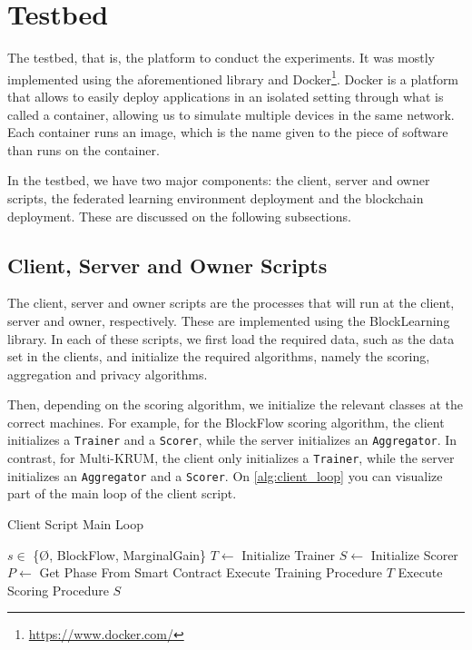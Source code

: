 \section{Testbed}

The testbed, that is, the platform to conduct the experiments. It was mostly implemented using the aforementioned library and Docker\footnote{\url{https://www.docker.com/}}. Docker is a platform that allows to easily deploy applications in an isolated setting through what is called a container, allowing us to simulate multiple devices in the same network. Each container runs an image, which is the name given to the piece of software than runs on the container.

In the testbed, we have two major components: the client, server and owner scripts, the federated learning environment deployment and the blockchain deployment. These are discussed on the following subsections.

\subsection{Client, Server and Owner Scripts}

The client, server and owner scripts are the processes that will run at the client, server and owner, respectively. These are implemented using the BlockLearning library. In each of these scripts, we first load the required data, such as the data set in the clients, and initialize the required algorithms, namely the scoring, aggregation and privacy algorithms.

Then, depending on the scoring algorithm, we initialize the relevant classes at the correct machines. For example, for the BlockFlow scoring algorithm, the client initializes a \texttt{Trainer} and a \texttt{Scorer}, while the server initializes an \texttt{Aggregator}. In contrast, for Multi-KRUM, the client only initializes a \texttt{Trainer}, while the server initializes an \texttt{Aggregator} and a \texttt{Scorer}. On \autoref{alg:client_loop} you can visualize part of the main loop of the client script.

\begin{algorithm}
\caption{Client Script Main Loop}\label{alg:client_loop}
\begin{algorithmic}
\Require $s \in$ \{\O, BlockFlow, MarginalGain\}
\State $T \gets $ Initialize Trainer
    \State $S \gets $ Initialize Scorer
\EndIf
{}
    \State $P \gets$ Get Phase From Smart Contract
        \State Execute Training Procedure $T$
        \State Execute Scoring Procedure $S$
    \EndIf
\EndWhile
\end{algorithmic}
\end{algorithm}

